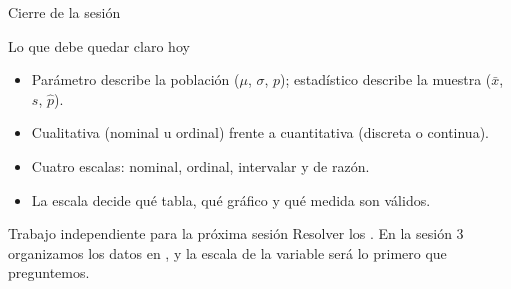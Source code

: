 \documentclass[aspectratio=169,10pt]{beamer}
\begin{document}
\begin{frame}{Cierre de la sesión}
  \begin{block}{Lo que debe quedar claro hoy}
    \begin{itemize}
      \item Parámetro describe la población ($\mu$, $\sigma$, $p$);
            estadístico describe la muestra ($\bar x$, $s$, $\hat p$).
      \item Cualitativa (nominal u ordinal) frente a cuantitativa (discreta o
            continua).
      \item Cuatro escalas: nominal, ordinal, intervalar y de razón.
      \item La escala decide qué tabla, qué gráfico y qué medida son válidos.
    \end{itemize}
  \end{block}

  \vspace{0.2cm}
  \begin{alertblock}{Trabajo independiente para la próxima sesión}
    \footnotesize
    Resolver los . En la sesión
    3 organizamos los datos en , y la escala de la
    variable será lo primero que preguntemos.
  \end{alertblock}
\end{frame}
\end{document}
